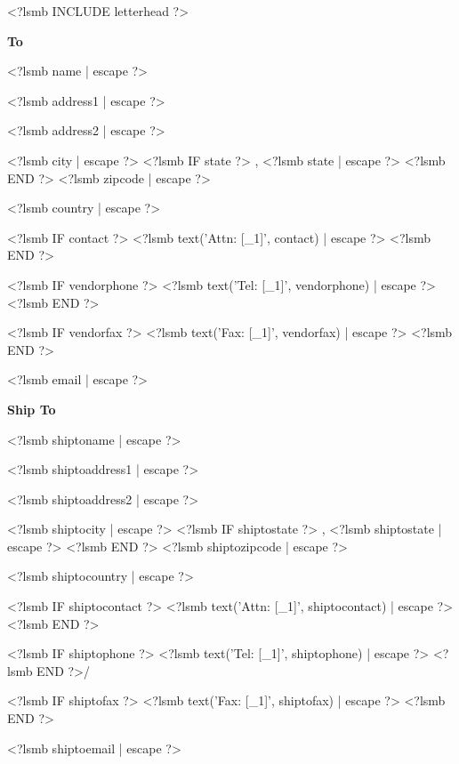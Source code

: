 \documentclass{scrartcl}
\begin{document}
\pagestyle{myheadings}
\thispagestyle{empty}

\fontsize{10pt}{12pt}\selectfont

<?lsmb INCLUDE letterhead ?>



\vspace*{0.5cm}

\parbox[t]{.5\textwidth}{
\textbf{To}
\vspace{0.3cm}

<?lsmb name | escape ?>

<?lsmb address1 | escape ?>

<?lsmb address2 | escape ?>

<?lsmb city | escape ?>
<?lsmb IF state ?>
\hspace{-0.1cm}, <?lsmb state | escape ?>
<?lsmb END ?>
<?lsmb zipcode | escape ?>

<?lsmb country | escape ?>

\vspace{0.3cm}

<?lsmb IF contact ?>
<?lsmb text('Attn: [_1]', contact) | escape ?>
\vspace{0.2cm}
<?lsmb END ?>

<?lsmb IF vendorphone ?>
<?lsmb text('Tel: [_1]', vendorphone) | escape ?>
<?lsmb END ?>

<?lsmb IF vendorfax ?>
<?lsmb text('Fax: [_1]', vendorfax) | escape ?>
<?lsmb END ?>

<?lsmb email | escape ?>
}
\parbox[t]{.5\textwidth}{
\textbf{Ship To}
\vspace{0.3cm}

<?lsmb shiptoname | escape ?>

<?lsmb shiptoaddress1 | escape ?>

<?lsmb shiptoaddress2 | escape ?>

<?lsmb shiptocity | escape ?>
<?lsmb IF shiptostate ?>
\hspace{-0.1cm}, <?lsmb shiptostate | escape ?>
<?lsmb END ?>
<?lsmb shiptozipcode | escape ?>

<?lsmb shiptocountry | escape ?>

\vspace{0.3cm}

<?lsmb IF shiptocontact ?>
<?lsmb text('Attn: [_1]', shiptocontact) | escape ?>
\vspace{0.2cm}
<?lsmb END ?>

<?lsmb IF shiptophone ?>
<?lsmb text('Tel: [_1]', shiptophone) | escape ?>
<?lsmb END ?>/

<?lsmb IF shiptofax ?>
<?lsmb text('Fax: [_1]', shiptofax) | escape ?>
<?lsmb END ?>

<?lsmb shiptoemail | escape ?>
}
\hfill
\end{document}
